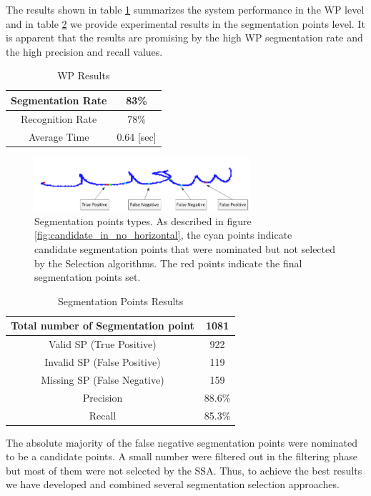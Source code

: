 \documentclass[journal,compsoc]{IEEEtran}
\begin{document}
The results shown in table \ref{table:wp_results} summarizes the system performance in the WP level and in table \ref{table:sp_results} we provide experimental results in the segmentation points level. It is apparent that the results are promising by the high WP segmentation rate and the high precision and recall values.

\begin{table}[h]
\caption{WP Results}
\begin{tabular}{ | c | c | }
  \hline
  Segmentation Rate &  83\% \\ 
 \hline
  Recognition Rate &  78\% \\ 
 \hline
  Average Time & 0.64 [sec] \\
\hline
\end{tabular}
\centering
\label{table:wp_results} 
\end{table}

\begin{figure}
\centering
\includegraphics[width=8cm]{./figures/sp_types}
\caption{Segmentation points types. As described in figure \ref{fig:candidate_in_no_horizontal}, the cyan points indicate candidate segmentation points that were nominated but not selected by the Selection algorithms. The red points indicate the final segmentation points set.}
\label{fig:sp_types}
\end{figure}

\begin{table}[h]
\caption{Segmentation Points Results}
\begin{tabular}{ | c | c | }
  \hline
  Total number of Segmentation point & 1081 \\
  \hline
  Valid SP (True Positive) & 922 \\
  \hline
  Invalid SP (False Positive) & 119 \\
  \hline
  Missing SP (False Negative) & 159 \\
  \hline                                    
  Precision & 88.6\% \\ 
 \hline
  Recall &  85.3\% \\ 
 \hline
\end{tabular}
\centering
\label{table:sp_results} 
\end{table}

The absolute majority of the false negative segmentation points were nominated to be a candidate points. A small number were filtered out in the filtering phase but most of them were not selected by the SSA. Thus, to achieve the best results we have developed and combined several segmentation selection approaches.
\end{document}
